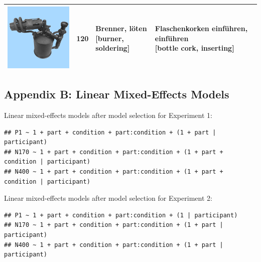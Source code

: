 \documentclass[
  english,
  doc,12pt,twoside,floatsintext]{apa7}
\begin{document}
\begin{center}
\begin{ThreePartTable}
{\begin{longtable}{llll}
\includegraphics[valign=c, scale=0.23]{../materials/unfamiliar/120.png} & 120 & \makecell[l]{Brenner, löten\\{[burner, soldering]}} & \makecell[l]{Flaschenkorken einführen, einführen\\{[bottle cork, inserting]}}\\
\bottomrule
\end{longtable}

}

\end{ThreePartTable}
\end{center}

\newpage

\hypertarget{appendix-b-linear-mixed-effects-models}{%
\subsection*{Appendix B: Linear Mixed-Effects Models}\label{appendix-b-linear-mixed-effects-models}}

\noindent Linear mixed-effects models after model selection for Experiment 1:

\footnotesize

\begin{verbatim}
## P1 ~ 1 + part + condition + part:condition + (1 + part | participant)
## N170 ~ 1 + part + condition + part:condition + (1 + part + condition | participant)
## N400 ~ 1 + part + condition + part:condition + (1 + part + condition | participant)
\end{verbatim}

\normalsize

\noindent Linear mixed-effects models after model selection for Experiment 2:

\footnotesize

\begin{verbatim}
## P1 ~ 1 + part + condition + part:condition + (1 | participant)
## N170 ~ 1 + part + condition + part:condition + (1 + part | participant)
## N400 ~ 1 + part + condition + part:condition + (1 + part | participant)
\end{verbatim}
\end{document}

